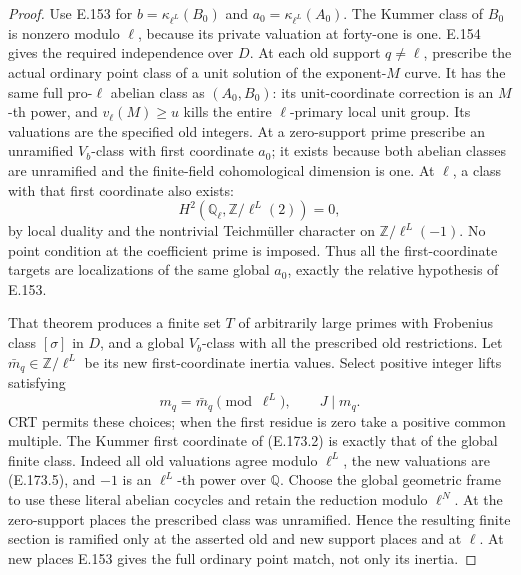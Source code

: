 \begin{proof}
Use E.153 for
\(b=\kappa_{\ell^L}(B_0)\) and \(a_0=\kappa_{\ell^L}(A_0)\).
The Kummer class of \(B_0\) is nonzero modulo \(\ell\),
because its private valuation at forty-one is one.
E.154 gives the required independence over \(D\).
At each old support \(q\ne\ell\), prescribe the actual
ordinary point class of a unit solution of the exponent-\(M\)
curve. It has the same full pro-\(\ell\) abelian class as
\((A_0,B_0)\): its unit-coordinate correction is an
\(M\)-th power, and \(v_\ell(M)\ge u\) kills the entire
\(\ell\)-primary local unit group. Its valuations are the
specified old integers.
At a zero-support prime prescribe an unramified \(V_b\)-class
with first coordinate \(a_0\); it exists because both abelian
classes are unramified and the finite-field cohomological
dimension is one. At \(\ell\), a class with that first
coordinate also exists:
\[
 H^2(\mathbb Q_\ell,\mathbb Z/\ell^L(2))=0,
 \tag{E.173.4}
\]
by local duality and the nontrivial Teichm\"uller character on
\(\mathbb Z/\ell^L(-1)\). No point condition at the coefficient
prime is imposed. Thus all the first-coordinate targets are
localizations of the same global \(a_0\), exactly the relative
hypothesis of E.153.

That theorem produces a finite set \(T\) of arbitrarily large
primes with Frobenius class \([\sigma]\) in \(D\), and a
global \(V_b\)-class with all the prescribed old restrictions.
Let \(\bar m_q\in\mathbb Z/\ell^L\) be its new first-coordinate
inertia values. Select positive integer lifts satisfying
\[
                  m_q=\bar m_q\pmod{\ell^L},\qquad J\mid m_q.
 \tag{E.173.5}
\]
CRT permits these choices; when the first residue is zero take
a positive common multiple. The Kummer first coordinate of
(E.173.2) is exactly that of the global finite class. Indeed all
old valuations agree modulo \(\ell^L\), the new valuations
are (E.173.5), and \(-1\) is an \(\ell^L\)-th power over
\(\mathbb Q\). Choose the global geometric frame to use these
literal abelian cocycles and retain the reduction modulo
\(\ell^N\). At the zero-support places the prescribed class
was unramified. Hence the resulting finite section is ramified
only at the asserted old and new support places and at \(\ell\).
At new places E.153 gives the full ordinary point match, not
only its inertia.


\end{proof}
